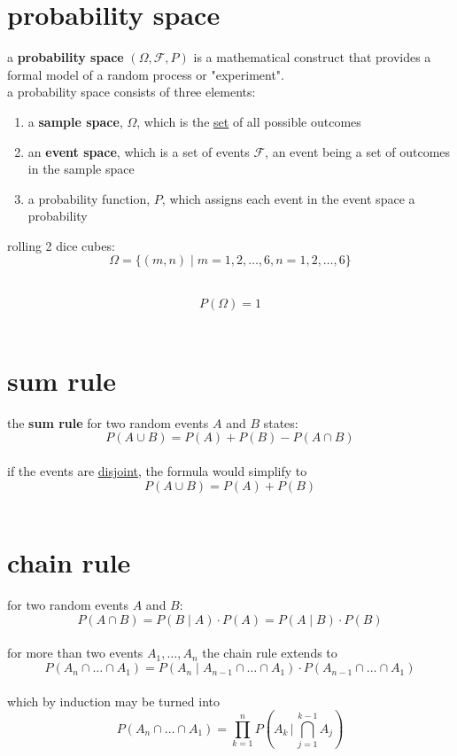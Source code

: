 \documentclass[a4paper,12pt]{article}
\begin{document}
\section{probability space}
\label{sec:org75774fa}
\begin{definition}
a \textbf{probability space} \((\Omega ,{\mathcal {F}},P)\) is a mathematical construct that provides a formal model of a random process or "experiment".\\
a probability space consists of three elements:\\
\begin{enumerate}
\item a \textbf{sample space}, \(\Omega\), which is the \href{discrete_maths2.org}{set} of all possible outcomes\\
\item an \textbf{event space}, which is a set of events \(\mathcal{F}\), an event being a set of outcomes in the sample space\\
\item a probability function, \(P\), which assigns each event in the event space a probability\\
\end{enumerate}
\begin{my_example}
rolling 2 dice cubes:\\
\[
\Omega = \{(m,n) \mid m=1,2,\dots,6, n=1,2,\dots,6\}
\]\\
\end{my_example}
\begin{lemma}
\[
P(\Omega) = 1
\]\\
\end{lemma}
\end{definition}
\section{sum rule}
\label{sec:org2d1bf64}
the \textbf{sum rule} for two random events \(A\) and \(B\) states:\\
\[
P(A\cup B)=P(A)+P(B)-P(A\cap B)
\]\\
if the events are \href{20230127023223-disjoint_events.org}{disjoint}, the formula would simplify to\\
\[
P(A \cup B) = P(A) + P(B)
\]\\
\section{chain rule}
\label{sec:orgcfe57dc}
for two random events \(A\) and \(B\):\\
\[
P(A\cap B) = P(B\mid A) \cdot P(A) = P(A\mid B) \cdot P(B)
\]\\
for more than two events \(A_{1},\dots,A_{n}\) the chain rule extends to\\
\[
P \left(A_{n}\cap \dots \cap A_{1}\right)= P\left(A_{n} \mid A_{n-1}\cap \dots \cap A_{1}\right)\cdot P\left(A_{n-1}\cap \dots \cap A_{1}\right)
\]\\
which by induction may be turned into\\
\[
P\left(A_{n} \cap \dots \cap A_{1}\right)=\prod_{k=1}^{n} P\left(A_{k}\,\Bigg|\,\bigcap_{j=1}^{k-1}A_{j}\right)
\]\\
\end{document}
